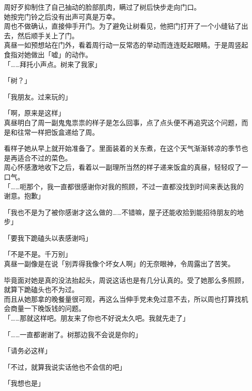 周好歹抑制住了自己抽动的脸部肌肉，瞒过了树后快步走向门口。\\

她按完门铃之后没有出声可真是万幸。\\

周也不做确认，直接伸手开门。为了避免让树看见，他把门打开了一个小缝钻了出去，然后顺手关上了门。\\

真昼一如预想站在门外，看着周行动一反常态的举动而连连眨起眼睛。于是周竖起食指对她做出「嘘」的动作。\\

「……拜托小声点。树来了我家」

「树？」

「我朋友。过来玩的」

「啊，原来是这样」\\

真昼明白了周一副鬼鬼祟祟的样子是怎么回事，点了点头便不再追究这个问题，而是和往常一样把饭盒递给了周。

看样子她从早上就开始准备了。里面装着的关东煮，在这个天气渐渐转凉的季节也是再适合不过的菜色。\\

周心怀感激地收下之后，看着以一副理所当然的样子递来饭盒的真昼，轻轻叹了一口气。\\

「……呃那个，我一直都很感谢你对我的照顾，不过一直都没找到时间来表达我的谢意。抱歉」

「我也不是为了被你感谢才这么做的……不错嘛，屋子还能收拾到能招待朋友的地步」

「要我下跪磕头以表感谢吗」

「不是不是。千万别」\\

真昼一副像是在说「别弄得我像个坏女人啊」的无奈眼神，令周露出了苦笑。

毕竟面对她是真的没法抬起头，周说这话也是有几分认真的。受了她那么多照顾，就算下跪磕头也不为过。\\

而且从她那拿的晚餐量很可观，再这么当伸手党未免过意不去，所以周也打算找机会商量一下晚饭钱的问题。\\

「……那就这样吧。朋友来了你也不好说太久吧。我就先走了」

「……一直都谢谢了。树那边我不会说是你的」

「请务必这样」

「不过，就算我说实话他也不会信的吧」

「我想也是」\\


